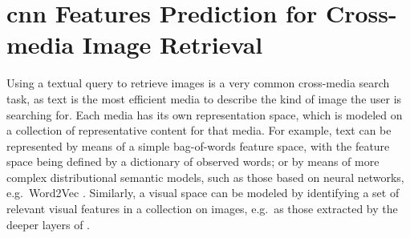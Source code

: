 
\graphicspath{{img/t2v/}}

\def\t{\mathbf{t}} %
\def\s{\mathbf{s}} %
\def\e{\mathbf{e}} %
\def\E{\mathbf{E}} %

\newcommand{\ttv}{\textsc{Text2Vis}}
\newcommand{\sparsettv}{\textsc{S-Text2Vis}}
\newcommand{\densettv}{\textsc{D-Text2Vis}}
\newcommand{\widedeepttv}{\textsc{W\&D-Text2Vis}}
\newcommand{\visreg}{\textsc{VisReg}}
\newcommand{\wordvisual}{\textsc{Word2VisualVec}}
\newcommand{\resnet}{\gls{resnet}-152}

\chapter{\gls{cnn} Features Prediction for Cross-media Image Retrieval}
\label{ch:text2vis}


Using a textual query to retrieve images is a very common cross-media search task, as text is the most efficient media to describe the kind of image the user is searching for.
Each media has its own representation space, which is modeled on a collection of representative content for that media.
For example, text can be represented by means of a simple bag-of-words feature space, with the feature space being defined by a dictionary of observed words; or by means of more complex distributional semantic models, such as those based on neural networks, e.g.\ Word2Vec \cite{mikolov2013distributed}.
Similarly, a visual space can be modeled by identifying a set of relevant visual features in a collection on images, e.g.\ as those extracted by the deeper layers of  \cite{krizhevsky2012imagenet}.

